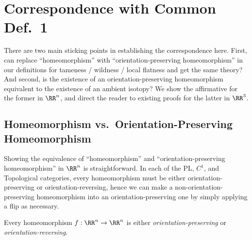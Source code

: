 \section{Correspondence with Common Def.\ 1}\label{sec:corr-cdef-1}
There are two main sticking points in establishing the correspondence
here. First, can replace ``homeomorphism'' with
``orientation-preserving homeomorphism'' in our definitions for
tameness / wildness / local flatness and get the same theory? And
second, is the existence of an orientation-preserving homeomorphism
equivalent to the existence of an ambient isotopy? We show the
affirmative for the former in $\RR^n$, and direct the reader to
existing proofs for the latter in $\RR^3$.

\subsection{Homeomorphism vs.\ Orientation-Preserving Homeomorphism}
Showing the equivalence of ``homeomorphism'' and
``orientation-preserving homeomorphism'' in $\RR^n$ is
straightforward. In each of the PL, $C^1$, and Topological categories,
every homeomorphism must be either orientation-preserving or
orientation-reversing, hence we can make a non-orientation-preserving
homeomorphism into an orientation-preserving one by simply applying a
flip as necessary.
\begin{theorem}\label{thm:orientation-preserving-or-not}
  Every homeomorphism $f : \RR^n \to \RR^n$ is either
  \emph{orientation-preserving} or \emph{orientation-reversing}.
\end{theorem}
